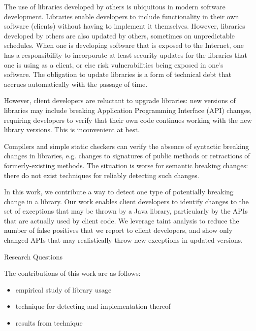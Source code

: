The use of libraries developed by others is ubiquitous in modern
software development. Libraries enable developers to include
functionality in their own software (clients) without having to
implement it themselves.  However, libraries developed by others are
also updated by others, sometimes on unpredictable schedules.  When
one is developing software that is exposed to the Internet, one has a
responsibility to incorporate at least security updates for the
libraries that one is using as a client, or else risk vulnerabilities
being exposed in one's software. The obligation to update libraries is
a form of technical debt that accrues automatically with the passage
of time.

However, client developers are reluctant to upgrade libraries: new
versions of libraries may include breaking Application Programming
Interface (API) changes, requiring developers to verify that their own
code continues working with the new library versions. This is
inconvenient at best.

Compilers and simple static checkers can verify the absence of
syntactic breaking changes in libraries, e.g. changes to signatures of
public methods or retractions of formerly-existing methods. The
situation is worse for semantic breaking changes: there do not exist
techniques for reliably detecting such changes.


In this work, we contribute a way to detect one type of potentially breaking
change in a library. Our work enables client developers to identify changes
to the set of exceptions that may be thrown by a Java library, particularly
by the APIs that are actually used by client code. We leverage taint analysis
to reduce the number of false positives that we report to client developers,
and show only changed APIs that may realistically throw new exceptions
in updated versions. %

Research Questions

The contributions of this work are as follows: 

\begin{itemize}[noitemsep]
\item empirical study of library usage
\item technique for detecting and implementation thereof
  \item results from technique
\end{itemize}

